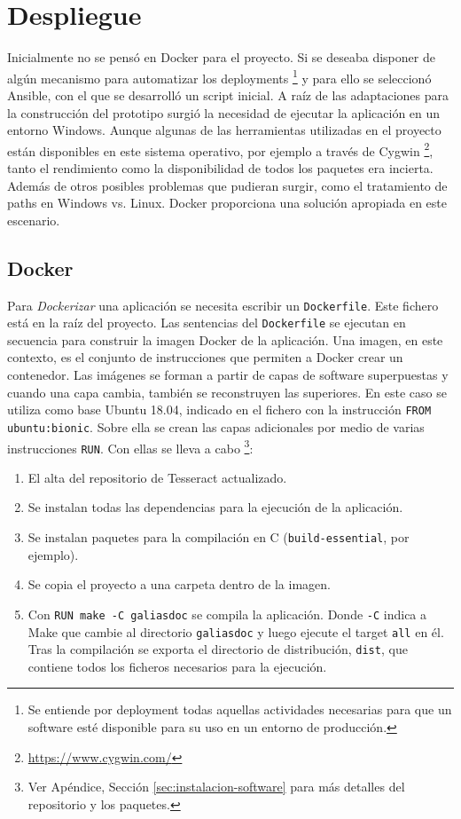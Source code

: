 \section{Despliegue}

Inicialmente no se pensó en Docker para el proyecto. Si se deseaba disponer de algún mecanismo para automatizar los deployments \footnote{Se entiende por deployment todas aquellas actividades necesarias para que un software esté disponible para su uso en un entorno de producción.} y para ello se seleccionó Ansible, con el que se desarrolló un script inicial. A raíz de las adaptaciones para la construcción del prototipo surgió la necesidad de ejecutar la aplicación en un entorno Windows. Aunque algunas de las herramientas utilizadas en el proyecto están disponibles en este sistema operativo, por ejemplo a través de Cygwin \footnote{\url{https://www.cygwin.com/}}, tanto el rendimiento como la disponibilidad de todos los paquetes era incierta. Además de otros posibles problemas que pudieran surgir, como el tratamiento de paths en Windows vs. Linux. Docker proporciona una solución apropiada en este escenario.

\subsection{Docker}

Para \emph{Dockerizar} una aplicación se necesita escribir un \verb|Dockerfile|. Este fichero está en la raíz del proyecto. Las sentencias del \verb|Dockerfile| se ejecutan en secuencia para construir la imagen Docker de la aplicación. Una imagen, en este contexto, es el conjunto de instrucciones que permiten a Docker crear un contenedor. Las imágenes se forman a partir de capas de software superpuestas y cuando una capa cambia, también se reconstruyen las superiores. En este caso se utiliza como base Ubuntu 18.04, indicado en el fichero con la instrucción \verb|FROM ubuntu:bionic|. Sobre ella se crean las capas adicionales por medio de varias instrucciones \verb|RUN|. Con ellas se lleva a cabo \footnote{Ver Apéndice, Sección \ref{sec:instalacion-software} para más detalles del repositorio y los paquetes.}:

\begin{enumerate}
    \item El alta del repositorio de Tesseract actualizado.
    \item Se instalan todas las dependencias para la ejecución de la aplicación.
    \item Se instalan paquetes para la compilación en C (\verb|build-essential|, por ejemplo).
    \item Se copia el proyecto a una carpeta dentro de la imagen.
	\item Con \verb|RUN make -C galiasdoc| se compila la aplicación. Donde \verb|-C| indica a Make que cambie al directorio \verb|galiasdoc| y luego ejecute el target \verb|all| en él. Tras la compilación se exporta el directorio de distribución, \verb|dist|, que contiene todos los ficheros necesarios para la ejecución.	
\end{enumerate}



